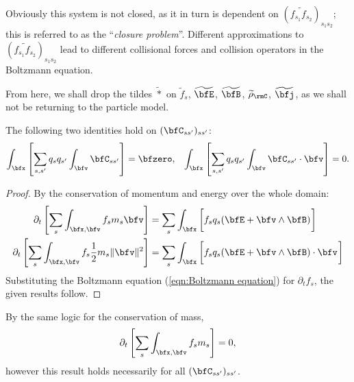     Obviously this system is not closed, as it in turn is dependent on $\left(\widetilde{f_{s_{1}}f_{s_{2}}}\right)_{s_{1}s_{2}}$; this is referred to as the ``\emph{closure problem}''. Different approximations to $\left(\widetilde{f_{s_{1}}f_{s_{2}}}\right)_{s_{1}s_{2}}$ lead to different collisional forces and collision operators in the Boltzmann equation.

    From here, we shall drop the tildes $\widetilde{*}$ on $\widetilde{f}_{s}$, $\widetilde{\bfE}$, $\widetilde{\bfB}$, $\widetilde{\rho}_{\rmC}$, $\widetilde{\bfj}$, as we shall not be returning to the particle model.

    \line
    
    \begin{lemma}\label{lem:conservation on collision operators}
        The following two identities hold on $(\bfC_{ss'})_{ss'}$:
        \begin{align}
            \int_{\bfx}\left[\sum_{s, s'}q_{s}q_{s'}\int_{\bfv}\bfC_{ss'}\right]           =  \bfzero,  &&
            \int_{\bfx}\left[\sum_{s, s'}q_{s}q_{s'}\int_{\bfv}\bfC_{ss'}\cdot\bfv\right]  =  0.
        \end{align}
    \end{lemma}
    \begin{proof}
        By the conservation of momentum and energy over the whole domain:
        \begin{align}
            \partial_{t}\left[\sum_{s}\int_{\bfx, \bfv}f_{s}m_{s}\bfv\right]                     &=  \sum_{s}\int_{\bfx}\left[f_{s}q_{s}(\bfE + \bfv\wedge\bfB)\tall\right]  \\
            \partial_{t}\left[\sum_{s}\int_{\bfx, \bfv}f_{s}\frac{1}{2}m_{s}\|\bfv\|^{2}\right]  &=  \sum_{s}\int_{\bfx}\left[f_{s}q_{s}(\bfE + \bfv\wedge\bfB)\cdot\bfv\tall\right]
        \end{align}
        Substituting the Boltzmann equation (\ref{eqn:Boltzmann equation}) for $\partial_{t}f_{s}$, the given results follow.
    \end{proof}
    
    \begin{remark}
        By the same logic for the conservation of mass,
        \begin{equation}
            \partial_{t}\left[\sum_{s}\int_{\bfx, \bfv}f_{s}m_{s}\right]  =  0,
        \end{equation}
        however this result holds necessarily for all $(\bfC_{ss'})_{ss'}$.
    \end{remark}
    
